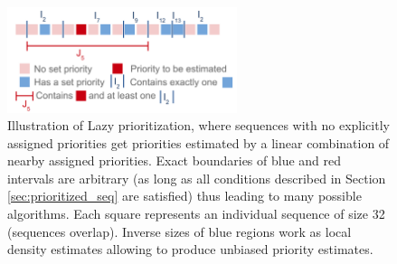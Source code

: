 \documentclass{article}
\begin{document}
\begin{figure}
\centering
\begin{minipage}{1.0\textwidth}  
  \centering
  \includegraphics[width=0.6\textwidth]{lazy_prioritization}
  \caption{Illustration of Lazy prioritization, where sequences with no 
    explicitly assigned priorities get priorities estimated by a linear 
    combination of nearby assigned priorities. Exact boundaries of blue 
    and red intervals are arbitrary (as long as all conditions described in 
    Section \ref{sec:prioritized_seq} are satisfied) thus leading to many 
    possible algorithms. Each square represents an individual sequence of 
    size 32 (sequences overlap).
    Inverse sizes of blue regions work as local density estimates allowing to 
    produce unbiased priority estimates.}
  \label{lazy-prioritization}
\end{minipage}%
\end{figure}
\end{document}
